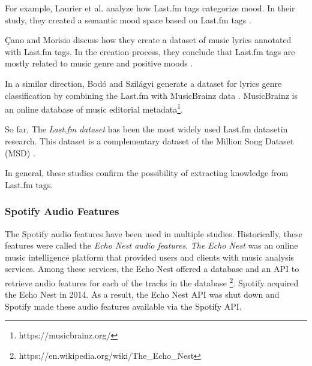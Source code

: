 \documentclass[sn-mathphys]{sn-jnl}%
\theoremstyle{thmstyleone}%
\theoremstyle{thmstyletwo}%
\theoremstyle{thmstylethree}%
\begin{document}

For example, Laurier et al. analyze how Last.fm tags categorize mood.
In their study, they created a semantic mood space based on Last.fm tags \cite{laurier2009music}.

{\c{C}}ano and Morisio discuss how they create a dataset of music
lyrics annotated with Last.fm tags.
In the creation process, they conclude that Last.fm tags are mostly related to music genre
and positive moods \cite{ccano2017music}.

In a similar direction, Bod{\'o} and Szil{\'a}gyi generate a dataset for lyrics genre classification
by combining the Last.fm with MusicBrainz data \cite{bodo2018connecting}.
MusicBrainz is an online database of music editorial metadata\footnote[1]{https://musicbrainz.org/}.

So far, The \emph{Last.fm dataset} has been the most widely used Last.fm dataset\footnotemark[2] in research.
This dataset is a complementary dataset of the Million Song Dataset (MSD) \cite{Bertin-Mahieux2011}.


In general, these studies confirm the possibility of extracting knowledge from Last.fm tags.


\subsubsection{Spotify Audio Features}


The Spotify audio features have been used in multiple studies.
Historically, these features were called the \emph{Echo Nest audio features}.
\emph{The Echo Nest} was an online music intelligence platform that provided users and clients with music analysis services.
Among these services, the Echo Nest offered a database and an API to retrieve audio features for each of the tracks in the database \footnote[3]{https://en.wikipedia.org/wiki/The\_Echo\_Nest}.
Spotify acquired the Echo Nest in 2014.
As a result, the Echo Nest API was shut down and Spotify made these audio features available via the Spotify API.
\end{document}
